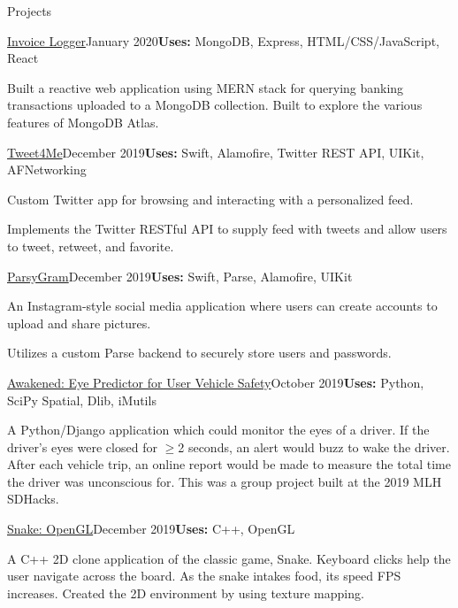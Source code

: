 \documentclass{resume} %
\begin{document}


\begin{rSection}{\faDatabase{ }}{Projects} 

\begin{rSubsection}{}{\href{https://github.com/rainarit/invoice-logger}{Invoice Logger}}{January 2020}{\textbf{Uses:} MongoDB, Express, HTML/CSS/JavaScript, React}{}
\item Built	a reactive web application using MERN stack for querying banking transactions uploaded to a MongoDB collection. Built to explore the various features of MongoDB Atlas.
\end{rSubsection}
\begin{rSubsection}{}{\href{https://github.com/rainarit/tweet4me}{Tweet4Me}}{December 2019}{\textbf{Uses:} Swift, Alamofire, Twitter REST API, UIKit, AFNetworking}{}
\item Custom Twitter app for browsing and interacting with a personalized feed.
\item Implements the Twitter RESTful API to supply feed with tweets and allow users to tweet, retweet, and favorite.
\end{rSubsection}
\begin{rSubsection}{}{\href{https://github.com/rainarit/parsy-gram}{ParsyGram}}{December 2019}{\textbf{Uses:} Swift, Parse, Alamofire, UIKit}{}
\item An Instagram-style social media application where users can create accounts to upload and share pictures.
\item Utilizes a custom Parse backend to securely store users and passwords.
\end{rSubsection}
\begin{rSubsection}{}{\href{https://github.com/rainarit/SDHacks2019_Awakened}{Awakened: Eye Predictor for User Vehicle Safety}}{October 2019}{\textbf{Uses: } Python, SciPy Spatial, Dlib, iMutils  }{}
\item A Python/Django application which could monitor the eyes of a driver. If the driver's eyes were closed for $\geq$2 seconds, an alert would buzz to wake the driver. After each vehicle trip, an online report would be made to measure the total time the driver was unconscious for. This was a group project built at the 2019 MLH SDHacks.
\end{rSubsection}
\begin{rSubsection}{}{\href{https://github.com/rainarit/snake-opengl}{Snake: OpenGL}}{December 2019}{\textbf{Uses: } C++, OpenGL}{}
\item A C++ 2D clone application of the classic game, Snake. Keyboard clicks help the user navigate across the board. As the snake intakes food, its speed FPS increases. Created the 2D environment by using texture mapping.
\end{rSubsection}
\end{rSection}


\end{document}
